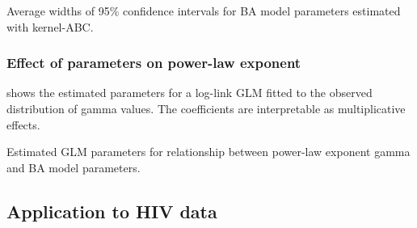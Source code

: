 \begin{table}
    \centering
    
    \caption{Average widths of 95\% confidence intervals for \gls{BA} model
    parameters estimated with kernel-\gls{ABC}.}
    \label{tab:glm}
\end{table}

\subsubsection*{Effect of parameters on power-law exponent}

 shows the estimated parameters for a log-link \gls{GLM} fitted
to the observed distribution of \gls{gamma} values. The coefficients are
interpretable as multiplicative effects.

\begin{table}
    \centering
    
    \caption{Estimated \gls{GLM} parameters for relationship between power-law
    exponent \gls{gamma} and \gls{BA} model parameters.}
    \label{tab:glm}
\end{table}

\subsection{Application to HIV data}



